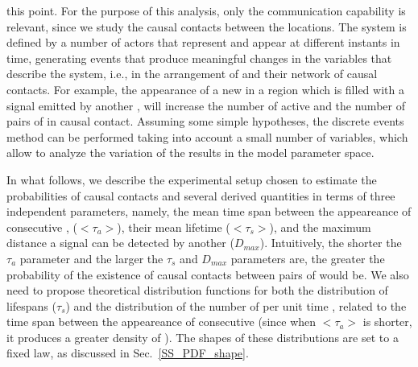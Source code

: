 this point.
%
%
For the purpose of this analysis, only the communication capability is
relevant, since we study the causal contacts between the locations.
%
The system is defined by a number of actors that represent \cetis and
appear at different instants in time, generating events that produce
meaningful changes in the variables that describe the system, i.e., in
the arrangement of \cetis and their network of causal contacts.
%
For example, the appearance of a new \ceti in a region which is filled
with a signal emitted by another \ceti, will increase the number of
active \cetis and the number of pairs of \cetis in causal contact.
%
Assuming some simple hypotheses, the discrete events method can be
performed taking into account a small number of variables, which allow
to analyze the variation of the results in the model parameter space.


In what follows, we describe the experimental setup chosen to estimate
the probabilities of causal contacts and several derived quantities in
terms of three independent parameters, namely, the mean time span
between the appeareance of consecutive \cetis, ($<\tau_a>$), their mean
lifetime ($<\tau_s>$), and the maximum distance a signal can be
detected by another \ceti ($D_{max}$).
%
Intuitively, the shorter the $\tau_a$ parameter and the larger the
$\tau_s$ and $D_{max}$ parameters are, the greater the probability of
the existence of causal contacts between pairs of \cetis would be.
%
We also need to propose theoretical distribution functions for both
the distribution of lifespans ($\tau_s$) and the distribution of the
number of \cetis per unit time \citep{maccone_evolution_2014,
Sotos_biotechnology_2019}, related to the time span between the
appeareance of consecutive \cetis (since when $<\tau_a>$ is shorter, it
produces a greater density of \cetis).
%
The shapes of these distributions are set to a fixed law, as discussed
in Sec.~\ref{SS_PDF_shape}.


